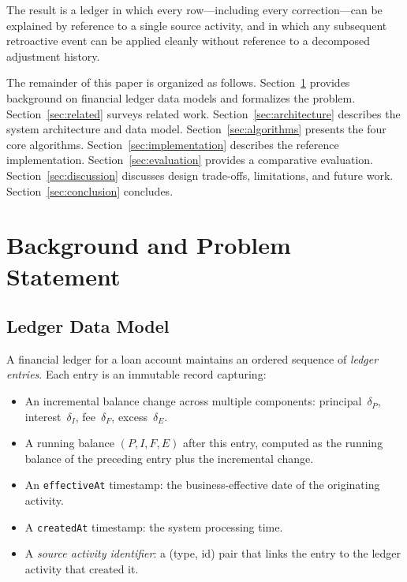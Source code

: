 \documentclass[11pt,letterpaper]{article}
\begin{document}
The result is a ledger in which every row---including every
correction---can be explained by reference to a single source activity,
and in which any subsequent retroactive event can be applied cleanly
without reference to a decomposed adjustment history.

The remainder of this paper is organized as follows. Section~\ref{sec:background}
provides background on financial ledger data models and formalizes the
problem. Section~\ref{sec:related} surveys related work.
Section~\ref{sec:architecture} describes the system architecture and
data model. Section~\ref{sec:algorithms} presents the four core
algorithms. Section~\ref{sec:implementation} describes the reference
implementation. Section~\ref{sec:evaluation} provides a comparative
evaluation. Section~\ref{sec:discussion} discusses design trade-offs,
limitations, and future work. Section~\ref{sec:conclusion} concludes.

\section{Background and Problem Statement}
\label{sec:background}

\subsection{Ledger Data Model}

A financial ledger for a loan account maintains an ordered sequence of
\emph{ledger entries}. Each entry is an immutable record capturing:

\begin{itemize}
  \item An incremental balance change across multiple components:
        principal~$\delta_P$, interest~$\delta_I$, fee~$\delta_F$, excess~$\delta_E$.
  \item A running balance $(P, I, F, E)$ after this entry, computed as
        the running balance of the preceding entry plus the incremental
        change.
  \item An \texttt{effectiveAt} timestamp: the business-effective date
        of the originating activity.
  \item A \texttt{createdAt} timestamp: the system processing time.
  \item A \emph{source activity identifier}: a (type, id) pair that
        links the entry to the ledger activity that created it.
\end{itemize}
\end{document}
